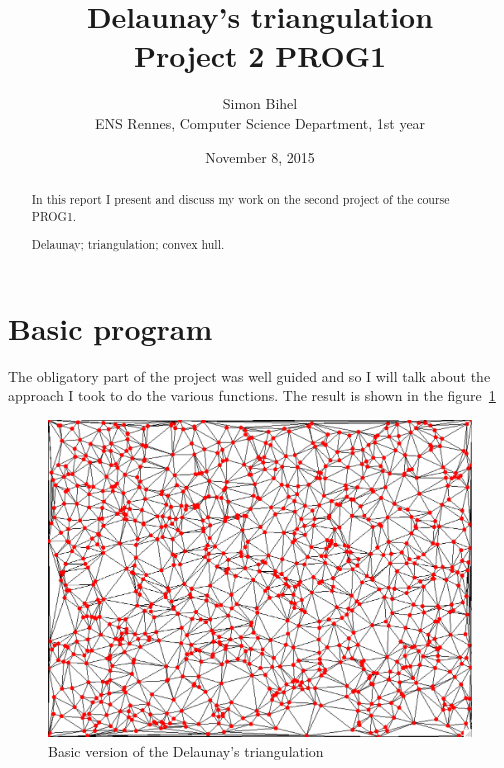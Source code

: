 \documentclass[a4paper,11pt]{article}%
\newenvironment{keywords}%
{\description\item[Keyword.]}%
{\enddescription}
\begin{document}
\title{Delaunay's triangulation \\ Project 2 PROG1}

\author{Simon Bihel \\ ENS Rennes, Computer Science Department, 1st year}

\date{November 8, 2015}

\maketitle

\begin{abstract}
	In this report I present and discuss my work on the second project of the course PROG1.
\begin{keywords}
	Delaunay; triangulation; convex hull.
\end{keywords}
\end{abstract}


\section{Basic program}

The obligatory part of the project was well guided and so I will talk about the approach I took to do the various functions. The result is shown in the figure~\ref{fig:basic} 

\begin{figure}[H]
	\begin{center}
		\includegraphics[scale=0.3]{basic.png}
	\end{center}
	\caption{Basic version of the Delaunay's triangulation}
	\label{fig:basic}
\end{figure}
\end{document}
